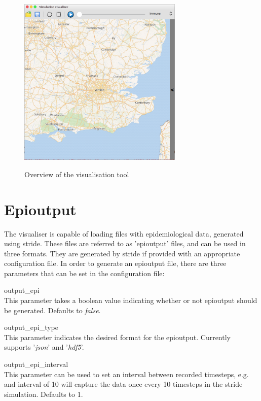 \begin{figure}[H]
\centering
\includegraphics[width=0.7\textwidth,keepaspectratio]{images/overview.png}
\label{fig:screenshot_overview}
\caption{Overview of the visualisation tool}
\end{figure}

\section{Epioutput}
\label{section:epioutput}
The visualiser is capable of loading files with epidemiological data, generated using stride. These files are referred to as 'epioutput' files, and can be used in three formats. They are generated by stride if provided with an appropriate configuration file. In order to generate an epioutput file, there are three parameters that can be set in the configuration file:

\begin{compactdesc}
\item [output\_epi] \ \\
    This parameter takes a boolean value indicating whether or not epioutput should be generated. Defaults to \emph{false}.
\item [output\_epi\_type] \ \\
    This parameter indicates the desired format for the epioutput. Currently supports '\emph{json}' and '\emph{hdf5}'.
\item [output\_epi\_interval] \ \\
    This parameter can be used to set an interval between recorded timesteps, e.g. and interval of 10 will capture the data once every 10 timesteps in the stride simulation. Defaults to 1.
\end{compactdesc}

